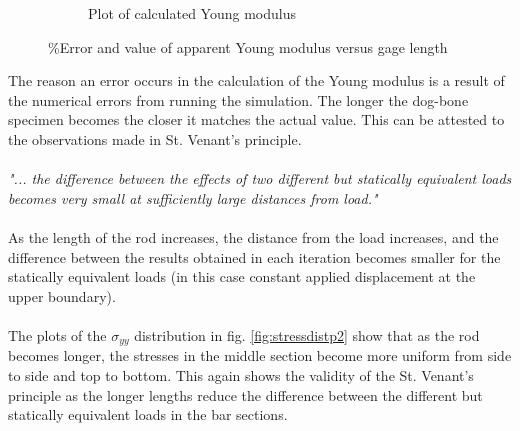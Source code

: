 \documentclass[paper=letter, fontsize=11pt]{scrartcl} %
\numberwithin{equation}{section} %
\numberwithin{figure}{section} %
\numberwithin{table}{section} %
\begin{document}
\begin{figure}[h]
\begin{subfigure}[b]{0.45\textwidth}
		\caption{Plot of calculated Young modulus}
		\label{fig:q2fig2}
	\end{subfigure}
	\caption{\%Error and value of apparent Young modulus versus gage length}
\end{figure}

The reason an error occurs in the calculation of the Young modulus is a result of the numerical errors from running the simulation. The longer the dog-bone specimen becomes the closer it matches the actual value. This can be attested to the observations made in St. Venant's principle.
\\\\
\textit{"... the difference between the effects of two different but statically equivalent loads becomes very small at sufficiently large distances from load."}
\\\\
As the length of the rod increases, the distance from the load increases, and the difference between the results obtained in each iteration becomes smaller for the statically equivalent loads (in this case constant applied displacement at the upper boundary). 
\\\\
The plots of the $\sigma_{yy}$ distribution in fig. \ref{fig:stressdistp2} show that as the rod becomes longer, the stresses in the middle section become more uniform from side to side and top to bottom. This again shows the validity of the St. Venant's principle as the longer lengths reduce the difference between the different but statically equivalent loads in the bar sections.
\end{document}
